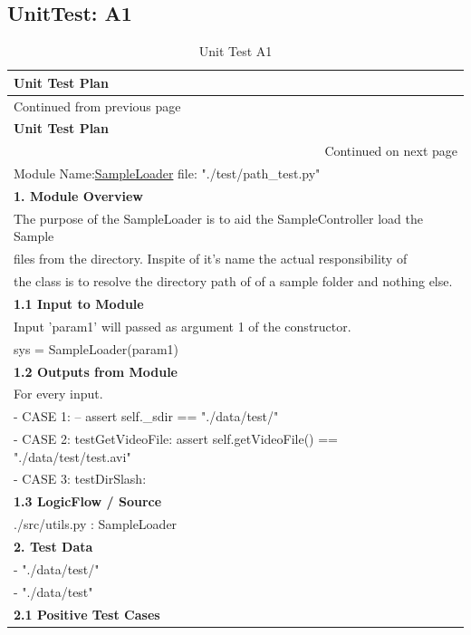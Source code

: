 \documentclass[12pt,a4paper,man]{report}
\begin{document}
\subsection{UnitTest: A1}
\label{sec:org9b92077}

\begin{longtable}{|p{7in}|}
\caption{\label{table:utest_a1}
Unit Test A1}
\\
\hline
\textbf{Unit Test Plan} \cellcolor{blue!25}\\
\hline
\endfirsthead
\multicolumn{1}{l}{Continued from previous page} \\
\hline

\textbf{Unit Test Plan} \cellcolor{blue!25} \\

\hline
\endhead
\hline\multicolumn{1}{r}{Continued on next page} \\
\endfoot
\endlastfoot
\hline
\hline
Module Name:\underline{SampleLoader} \hspace{2in}  file:  "./test/path\_test.py"\\
\hline
\textbf{1. Module Overview}\\
\hline
The purpose of the SampleLoader is to aid the SampleController load the Sample\\
files from the directory. Inspite of it's name the actual responsibility  of\\
the class is to resolve the directory path of of a sample folder and nothing else.\\
\hline
\textbf{1.1 Input to Module}\\
\hline
Input 'param1' will passed as argument 1 of the constructor.\\
sys = SampleLoader(param1)\\
\hline
\textbf{1.2 Outputs from Module}\\
\hline
For every input.\\
- CASE 1:  -- assert self.\_sdir == "./data/test/"\\
- CASE 2: testGetVideoFile: assert self.getVideoFile() == "./data/test/test.avi"\\
- CASE 3: testDirSlash:\\
\hline
\textbf{1.3 LogicFlow / Source}\\
\hline
./src/utils.py : SampleLoader\\
\hline
\textbf{2. Test Data}\\
\hline
- "./data/test/"\\
- "./data/test"\\
\hline
\textbf{2.1 Positive Test Cases}\\

\end{longtable}
\end{document}
